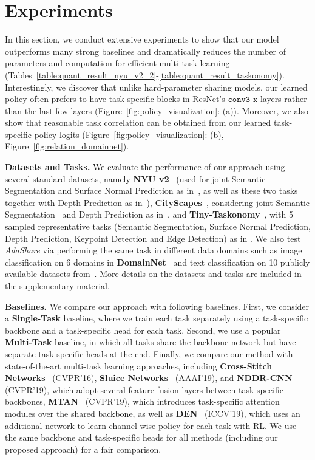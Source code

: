 \section{Experiments} \label{sec:experiments}
In this section, we 
conduct extensive experiments to show that our model outperforms many strong baselines
and dramatically reduces the number of parameters and computation for efficient multi-task learning (Tables~\ref{table:quant_result_nyu_v2_2}-\ref{table:quant_result_taskonomy}). 
Interestingly, we discover that unlike hard-parameter sharing models, our learned policy often prefers to have task-specific blocks in ResNet's $\mathtt{conv3\_x}$ layers rather than the last few layers (Figure~\ref{fig:policy_visualization}: (a)). 
Moreover, we also show that reasonable task correlation can be obtained from our learned task-specific policy logits (Figure~\ref{fig:policy_visualization}: (b), Figure~\ref{fig:relation_domainnet}). 

\noindent\textbf{Datasets and Tasks.} We evaluate the performance of our approach using several standard  datasets, namely \textbf{NYU v2}~\cite{Silberman:ECCV12} (used for joint Semantic Segmentation and Surface Normal Prediction as in~\cite{Misra16,gao2019nddr}, as well as these two tasks together with Depth Prediction as in~\cite{liu2019end}),  \textbf{CityScapes}~\cite{cordts2016cityscapes}, considering joint Semantic Segmentation~\cite{chen2017deeplab, tao2020hierarchical, hu2020real, Hu_2020_CVPR} and Depth Prediction as in~\cite{liu2019end},
and \textbf{Tiny-Taskonomy}~\cite{zamir2018taskonomy},
with 5 sampled representative tasks (Semantic Segmentation, Surface Normal Prediction, Depth Prediction, Keypoint Detection and Edge Detection)
as in \cite{standley2019tasks}. We also test \textit{AdaShare} via performing the same task in different data domains such as image classification on 6 domains in \textbf{DomainNet}~\cite{peng2019moment} and text classification on 10 publicly available datasets from~\cite{chen2018exploring}.
More details on the datasets and tasks are included in the supplementary material.


\noindent\textbf{Baselines.} We compare our approach with following baselines. First, we consider a \textbf{Single-Task} baseline, where we train each task separately using a task-specific backbone and a task-specific head for each task.
Second, we use a popular \textbf{Multi-Task} baseline, in which all tasks share the backbone network but have separate task-specific heads at the end. Finally, we compare our method with state-of-the-art multi-task learning approaches, including \textbf{Cross-Stitch Networks}~\cite{Misra16} (CVPR'16), \textbf{Sluice Networks}~\cite{ruder122017sluice} (AAAI'19), and \textbf{NDDR-CNN}~\cite{gao2019nddr} (CVPR'19), which adopt several feature fusion layers between task-specific backbones, 
\textbf{MTAN}~\cite{liu2019end} (CVPR'19), which introduces task-specific attention modules over the shared backbone, as well as \textbf{DEN}~\cite{ahn2019deep} (ICCV'19), which uses an additional network to learn channel-wise policy for each task with RL. 
We use the same backbone and task-specific heads for all methods (including our proposed approach) for a fair comparison. 


